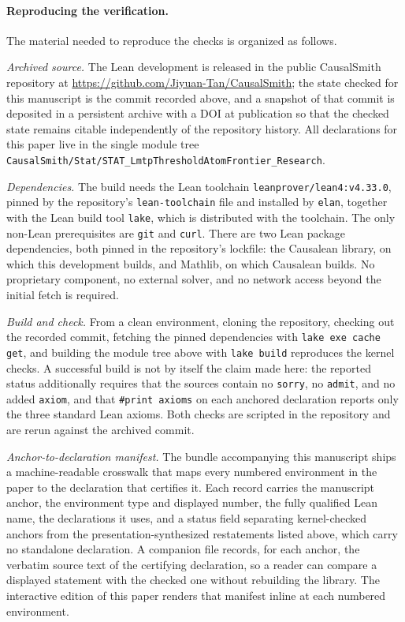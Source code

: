 \documentclass[11pt]{article}
\begin{document}
\paragraph{Reproducing the verification.}
The material needed to reproduce the checks is organized as follows.

\emph{Archived source.}  The Lean development is released in the public CausalSmith repository at \url{https://github.com/Jiyuan-Tan/CausalSmith}; the state checked for this manuscript is the commit recorded above, and a snapshot of that commit is deposited in a persistent archive with a DOI at publication so that the checked state remains citable independently of the repository history.  All declarations for this paper live in the single module tree \texttt{CausalSmith/Stat/STAT\_LmtpThresholdAtomFrontier\_Research}.

\emph{Dependencies.}  The build needs the Lean toolchain \texttt{leanprover/lean4:v4.33.0}, pinned by the repository's \texttt{lean-toolchain} file and installed by \texttt{elan}, together with the Lean build tool \texttt{lake}, which is distributed with the toolchain.  The only non-Lean prerequisites are \texttt{git} and \texttt{curl}.  There are two Lean package dependencies, both pinned in the repository's lockfile: the Causalean library, on which this development builds, and Mathlib, on which Causalean builds.  No proprietary component, no external solver, and no network access beyond the initial fetch is required.

\emph{Build and check.}  From a clean environment, cloning the repository, checking out the recorded commit, fetching the pinned dependencies with \texttt{lake exe cache get}, and building the module tree above with \texttt{lake build} reproduces the kernel checks.  A successful build is not by itself the claim made here: the reported status additionally requires that the sources contain no \texttt{sorry}, no \texttt{admit}, and no added \texttt{axiom}, and that \texttt{\#print axioms} on each anchored declaration reports only the three standard Lean axioms.  Both checks are scripted in the repository and are rerun against the archived commit.

\emph{Anchor-to-declaration manifest.}  The bundle accompanying this manuscript ships a machine-readable crosswalk that maps every numbered environment in the paper to the declaration that certifies it.  Each record carries the manuscript anchor, the environment type and displayed number, the fully qualified Lean name, the declarations it uses, and a status field separating kernel-checked anchors from the presentation-synthesized restatements listed above, which carry no standalone declaration.  A companion file records, for each anchor, the verbatim source text of the certifying declaration, so a reader can compare a displayed statement with the checked one without rebuilding the library.  The interactive edition of this paper renders that manifest inline at each numbered environment.
\end{document}
